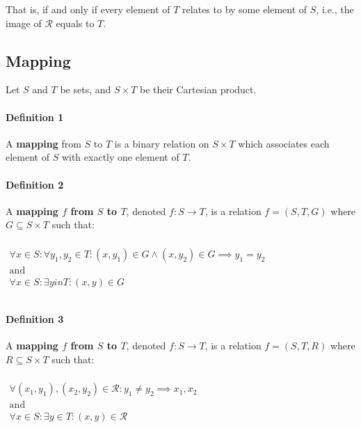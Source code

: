 That is, if and only if every element of $T$ relates to by some
element of $S$, i.e., the image of $\mathcal{R}$ equals to $T$.


\subsection{Mapping}
\label{sec:mapping}

Let $S$ and $T$ be sets, and $S \times T$ be their Cartesian product.


\paragraph{Definition 1}

A \textbf{mapping} from $S$ to $T$ is a binary relation on
$S \times T$ which associates each element of $S$ with exactly one
element of $T$.

\paragraph{Definition 2}

A \textbf{mapping $f$ from $S$ to $T$}, denoted $f: S \to T$, is a
relation $f = (S, T, G)$ where $G \subseteq S \times T$ such that:

\begin{math}
  \begin{array}{l}
    \\
    \forall x \in S: \forall y_1, y_2 \in T: (x, y_1) \in G \land (x, y_2) \in G \implies y_1 = y_2 \\
    \text{and} \\
    \forall x \in S: \exists y in T: (x, y) \in G \\
    \\
  \end{array}
\end{math}

\paragraph{Definition 3}

A \textbf{mapping $f$ from $S$ to $T$}, denoted $f: S \to T$, is a
relation $f = (S, T, R)$ where $R \subseteq S \times T$ such that:

\begin{math}
  \begin{array}{l}
    \\
    \forall (x_1, y_1), (x_2, y_2) \in \mathcal{R}: y_1 \neq y_2 \implies x_1, x_2 \\
    \text{and} \\
    \forall x \in S: \exists y \in T: (x, y) \in \mathcal{R} \\
    \\
  \end{array}
\end{math}

